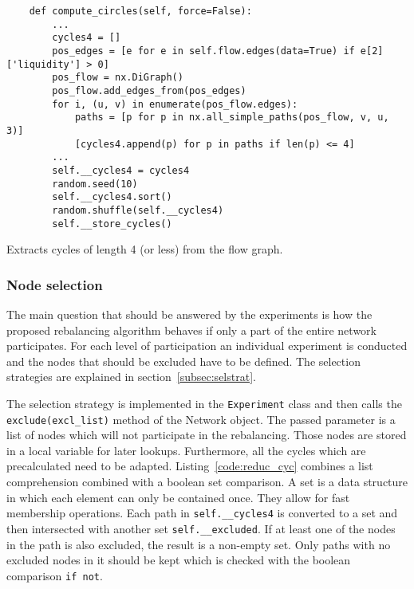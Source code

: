 \documentclass[final]{fhnwreport}       %
\begin{document}
\begin{listing}[H]
  \begin{verbatim}
    def compute_circles(self, force=False):
        ...
        cycles4 = []
        pos_edges = [e for e in self.flow.edges(data=True) if e[2]['liquidity'] > 0]
        pos_flow = nx.DiGraph()
        pos_flow.add_edges_from(pos_edges)
        for i, (u, v) in enumerate(pos_flow.edges):
            paths = [p for p in nx.all_simple_paths(pos_flow, v, u, 3)]
            [cycles4.append(p) for p in paths if len(p) <= 4]
        ...
        self.__cycles4 = cycles4
        random.seed(10)
        self.__cycles4.sort()
        random.shuffle(self.__cycles4)
        self.__store_cycles()
  \end{verbatim}
  \caption{Extracts cycles of length 4 (or less) from the flow graph.}
  \label{code:comp_circles}
\end{listing}

\subsubsection{Node selection}
The main question that should be answered by the experiments is how the proposed rebalancing algorithm behaves if only a part of the entire network participates. For each level of participation an individual experiment is conducted and the nodes that should be excluded have to be defined. The selection strategies are explained in section~\ref{subsec:selstrat}.

The selection strategy is implemented in the \texttt{Experiment} class and then calls the \texttt{exclude(excl_list)} method of the Network object. The passed parameter is a list of nodes which will not participate in the rebalancing. Those nodes are stored in a local variable for later lookups. Furthermore, all the cycles which are precalculated need to be adapted. Listing~\ref{code:reduc_cyc} combines a list comprehension combined with a boolean set comparison. A set is a data structure in which each element can only be contained once. They allow for fast membership operations. Each path in \texttt{self.__cycles4} is converted to a set and then intersected with another set \texttt{self.__excluded}. If at least one of the nodes in the path is also excluded, the result is a non-empty set. Only paths with no excluded nodes in it should be kept which is checked with the boolean comparison \texttt{if not}.  
\end{document}
